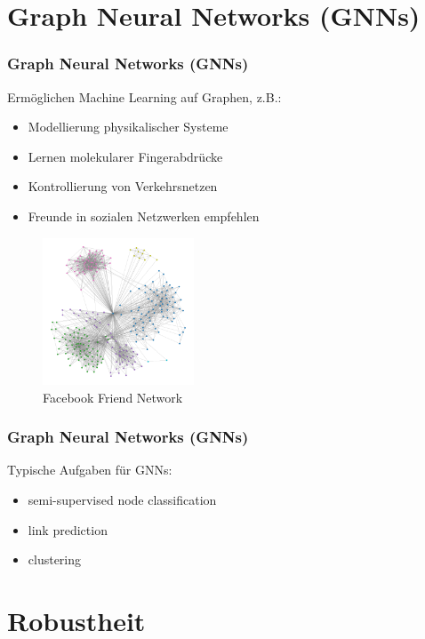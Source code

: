 \documentclass{beamer}
\begin{document}
\section{Graph Neural Networks (GNNs)}

\begin{frame}
  \frametitle{Graph Neural Networks (GNNs)}
  Ermöglichen Machine Learning auf Graphen, z.B.:
  \begin{itemize}
    \item Modellierung physikalischer Systeme
    \item Lernen molekularer Fingerabdrücke
    \item Kontrollierung von Verkehrsnetzen
    \item Freunde in sozialen Netzwerken empfehlen
  \end{itemize}
  \begin{figure}
    \centering
    \includegraphics[width=0.4\textwidth]{img/social_graph.png}
    \caption*{Facebook Friend Network \cite{}}
  \end{figure}
\end{frame}

\begin{frame}
  \frametitle{Graph Neural Networks (GNNs)}
  Typische Aufgaben für GNNs:
  \begin{itemize}
    \item semi-supervised node classification
    \item link prediction
    \item clustering
  \end{itemize}

\end{frame}

\section{Robustheit}
\end{document}

